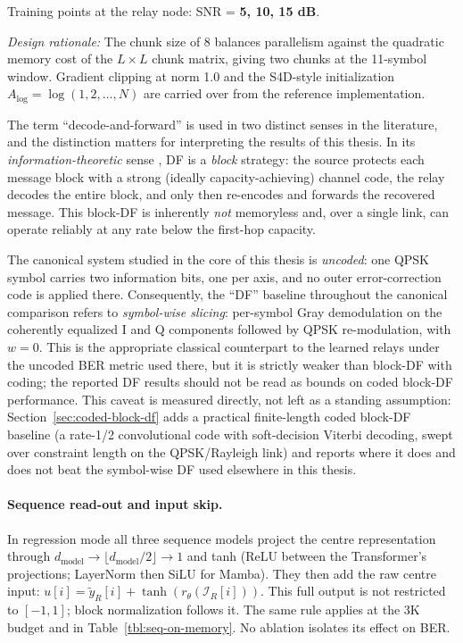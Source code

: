 \begin{enumerate}
  Training points at the relay node: SNR = \textbf{5, 10, 15 dB}.

  \emph{Design rationale:} The chunk size of 8 balances parallelism against the quadratic memory cost of the $L\times L$ chunk matrix, giving two chunks at the 11-symbol window. Gradient clipping at norm 1.0 and the S4D-style initialization $A_{\log}=\log(1,2,\dots,N)$ are carried over from the reference implementation.

\end{enumerate}

\begin{remark}\label{rem:df-terminology}
The term ``decode-and-forward'' is used in two distinct senses in the literature, and the distinction matters for interpreting the results of this thesis. In its \emph{information-theoretic} sense \cite{CoverGamal1979RelayChannel,ElGamalKim2011NetworkIT}, DF is a \emph{block} strategy: the source protects each message block with a strong (ideally capacity-achieving) channel code, the relay decodes the entire block, and only then re-encodes and forwards the recovered message. This block-DF is inherently \emph{not} memoryless and, over a single link, can operate reliably at any rate below the first-hop capacity.

The canonical system studied in the core of this thesis is \emph{uncoded}: one QPSK symbol carries two information bits, one per axis, and no outer error-correction code is applied there. Consequently, the ``DF'' baseline throughout the canonical comparison refers to \emph{symbol-wise slicing}: per-symbol Gray demodulation on the coherently equalized I and Q components followed by QPSK re-modulation, with $w=0$. This is the appropriate classical counterpart to the learned relays under the uncoded BER metric used there, but it is strictly weaker than block-DF with coding; the reported DF results should not be read as bounds on coded block-DF performance. This caveat is measured directly, not left as a standing assumption: Section~\ref{sec:coded-block-df} adds a practical finite-length coded block-DF baseline (a rate-1/2 convolutional code with soft-decision Viterbi decoding, swept over constraint length on the QPSK/Rayleigh link) and reports where it does and does not beat the symbol-wise DF used elsewhere in this thesis.
\end{remark}

\paragraph{Sequence read-out and input skip.} In regression mode all three sequence models project the centre representation through $d_{\text{model}}\to\lfloor d_{\text{model}}/2\rfloor\to1$ and tanh (ReLU between the Transformer's projections; LayerNorm then SiLU for Mamba). They then add the raw centre input: $u[i]=\tilde y_R[i]+\tanh(r_\theta(\mathcal I_R[i]))$. This full output is not restricted to $[-1,1]$; block normalization follows it. The same rule applies at the 3K budget and in Table~\ref{tbl:seq-on-memory}. No ablation isolates its effect on BER.

